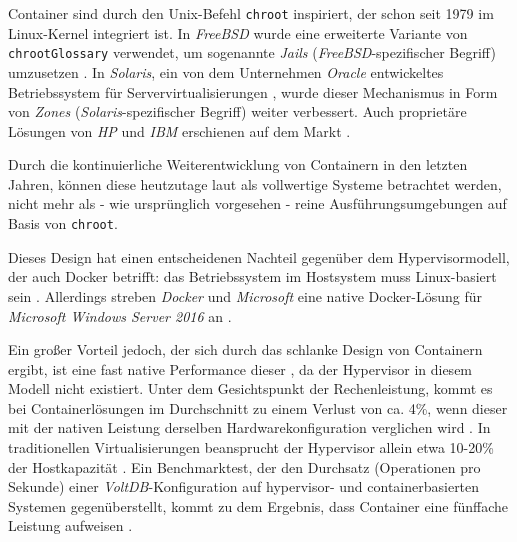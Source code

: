 \documentclass[../main.tex]{subfiles}
\begin{document}
      Container sind durch den Unix-Befehl \texttt{\acrshort{chroot}} inspiriert, der schon seit 1979 im Linux-Kernel integriert ist. In \emph{FreeBSD} wurde eine erweiterte Variante von \texttt{\gls{chrootGlossary}} verwendet, um sogenannte \emph{Jails} (\emph{FreeBSD}-spezifischer Begriff) umzusetzen \cite{jails}. In \emph{Solaris}, ein von dem Unternehmen \emph{Oracle} entwickeltes Betriebssystem für Servervirtualisierungen \cite{solaris}, wurde dieser Mechanismus in Form von \emph{Zones} (\emph{Solaris}-spezifischer Begriff) \cite{zones} weiter verbessert. Auch proprietäre Lösungen von \emph{HP} und \emph{IBM} erschienen auf dem Markt \cite[S.2]{dockerLXCKub}.

			Durch die kontinuierliche Weiterentwicklung von Containern in den letzten Jahren, können diese heutzutage laut \cite[S.7]{dockerBook} als vollwertige Systeme betrachtet werden, nicht mehr als - wie ursprünglich vorgesehen - reine Ausführungsumgebungen auf Basis von \texttt{chroot}.

			Dieses Design hat einen entscheidenen Nachteil gegenüber dem Hypervisormodell, der auch Docker betrifft: das Betriebssystem im Hostsystem muss Linux-basiert sein \cite[S.6]{dockerBook}. Allerdings streben \emph{Docker} und \emph{Microsoft} eine native Docker-Lösung für \emph{Microsoft Windows Server 2016} an \cite{dockerWindowsSupport}.

			Ein großer Vorteil jedoch, der sich durch das schlanke Design von Containern ergibt, ist eine fast native Performance dieser \cite[S.1]{containerVirtPerformance}, da der Hypervisor in diesem Modell nicht existiert. Unter dem Gesichtspunkt der Rechenleistung, kommt es bei Containerlösungen im Durchschnitt zu einem Verlust von ca. 4\%, wenn dieser mit der nativen Leistung derselben Hardwarekonfiguration verglichen wird \cite[S.4]{containerVirtPerformance}\cite[S.5]{IBMcontVMcomparison}. In traditionellen Virtualisierungen beansprucht der Hypervisor allein etwa 10-20\% der Hostkapazität \cite[S.2]{dockerIntroIEEE}\cite[S.5]{IBMcontVMcomparison}. Ein Benchmarktest, der den Durchsatz (Operationen pro Sekunde) einer \emph{VoltDB}-Konfiguration \cite{voltdb} auf hypervisor- und containerbasierten Systemen gegenüberstellt, kommt zu dem Ergebnis, dass Container eine fünffache Leistung aufweisen \cite[S.2f.]{voltdbBenchmark}.
\end{document}
